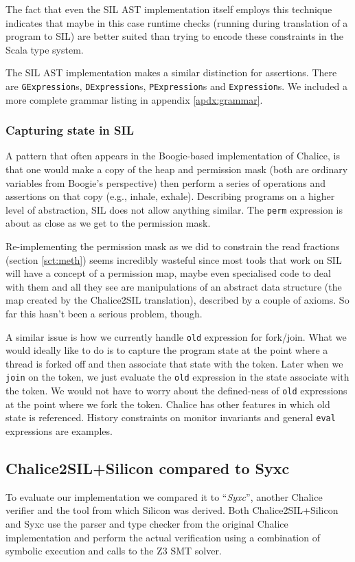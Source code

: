 The fact that even the SIL AST implementation itself employs this technique indicates that maybe in this case runtime checks (running during translation of a program to SIL) are better suited than trying to encode these constraints in the Scala type system.

The SIL AST implementation makes a similar distinction for assertions. 
There are \texttt{GExpression}s, \lstinline!DExpression!s, \lstinline!PExpression!s and \lstinline!Expression!s. 
We included a more complete grammar listing in appendix \ref{apdx:grammar}.

\subsubsection{Capturing state in SIL}
A pattern that often appears in the Boogie-based implementation of Chalice, is that one would make a copy of the heap and permission mask (both are ordinary variables from Boogie's perspective) then perform a series of operations and assertions on that copy (e.g., inhale, exhale).
Describing programs on a higher level of abstraction, SIL does not allow anything similar.
The \lstinline[language=Chalice]!perm! expression is about as close as we get to the permission mask.

Re-implementing the permission mask as we did to constrain the read fractions (section \ref{sct:meth}) seems incredibly wasteful since most tools that  work on SIL will have a concept of a permission map, maybe even specialised code to deal with them and all they see are manipulations of an abstract data structure (the map created by the Chalice2SIL translation), described by a couple of axioms.
So far this hasn't been a serious problem, though.

A similar issue is how we currently handle \lstinline[language=Chalice]!old! expression for fork/join.
What we would ideally like to do is to capture the program state at the point where a thread is forked off and then associate that state with the token.
Later when we \lstinline[language=Chalice]!join! on the token, we just evaluate the \lstinline[language=Chalice]!old! expression in the state associate with the token. 
We would not have to worry about the defined-ness of \lstinline[language=Chalice]!old! expressions at the point where we fork the token.
Chalice has other features in which old state is referenced. 
History constraints on monitor invariants and general \lstinline[language=Chalice]!eval! expressions are examples.

\subsection{Chalice2SIL+Silicon compared to Syxc}
To evaluate our implementation we compared it to ``\emph{Syxc}'', another Chalice verifier and the tool from which Silicon was derived.
Both Chalice2SIL+Silicon and Syxc use the parser and type checker from the original Chalice implementation and perform the actual verification using a combination of symbolic execution and calls to the Z3 SMT solver.


